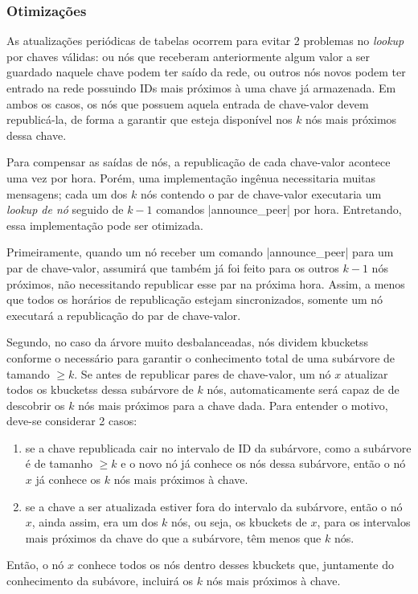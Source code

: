 
\subsubsection*{Otimizações}

As atualizações periódicas de tabelas ocorrem para evitar 2 problemas no \emph{lookup}
por chaves válidas: ou nós que receberam anteriormente algum valor a ser guardado
naquele chave podem ter saído da rede, ou outros nós novos podem ter entrado na rede
possuindo IDs mais próximos à uma chave já armazenada. Em ambos os casos, os nós que
possuem aquela entrada de chave-valor devem republicá-la, de forma a garantir que esteja
disponível nos $k$ nós mais próximos dessa chave.

Para compensar as saídas de nós, a republicação de cada chave-valor acontece uma vez por
hora. Porém, uma implementação ingênua necessitaria muitas mensagens; cada um dos $k$
nós contendo o par de chave-valor executaria um \emph{lookup de nó} seguido de $k - 1$
comandos \bverb|announce_peer| por hora. Entretando, essa implementação pode ser
otimizada.

Primeiramente, quando um nó receber um comando \bverb|announce_peer| para um par de
chave-valor, assumirá que também já foi feito para os outros $k - 1$ nós próximos, não
necessitando republicar esse par na próxima hora. Assim, a menos que todos os horários
de republicação estejam sincronizados, somente um nó executará a republicação do par de
chave-valor.

Segundo, no caso da árvore muito desbalanceadas, nós dividem \glspl*{kbuckets} conforme
o necessário para garantir o conhecimento total de uma subárvore de tamando $\geq k$. Se
antes de republicar pares de chave-valor, um nó $x$ atualizar todos os \glspl*{kbuckets}
dessa subárvore de $k$ nós, automaticamente será capaz de de descobrir os $k$ nós
mais próximos para a chave dada. Para entender o motivo, deve-se considerar 2 casos:

\begin{enumerate}
    \item se a chave republicada cair no intervalo de ID da subárvore, como a subárvore
        é de tamanho $\geq k$ e o novo nó já conhece os nós dessa subárvore, então o nó
        $x$ já conhece os $k$ nós mais próximos à chave.

    \item se a chave a ser atualizada estiver fora do intervalo da subárvore, então o
        nó $x$, ainda assim, era um dos $k$ nós, ou seja, os \glspl*{kbucket} de $x$,
        para os intervalos mais próximos da chave do que a subárvore, têm menos que $k$
        nós.
\end{enumerate}

Então, o nó $x$ conhece todos os nós dentro desses \glspl*{kbucket} que, juntamente do
conhecimento da subávore, incluirá os $k$ nós mais próximos à chave.